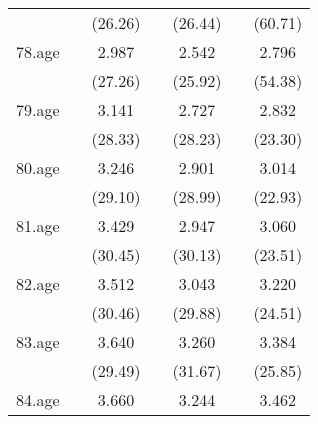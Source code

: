 {\begin{tabular}{l*{6}{c}}
            &                     &     (26.26)         &                     &     (26.44)         &                     &     (60.71)         \\
[1em]
78.age      &                     &       2.987\sym{***}&                     &       2.542\sym{***}&                     &       2.796\sym{***}\\
            &                     &     (27.26)         &                     &     (25.92)         &                     &     (54.38)         \\
[1em]
79.age      &                     &       3.141\sym{***}&                     &       2.727\sym{***}&                     &       2.832\sym{***}\\
            &                     &     (28.33)         &                     &     (28.23)         &                     &     (23.30)         \\
[1em]
80.age      &                     &       3.246\sym{***}&                     &       2.901\sym{***}&                     &       3.014\sym{***}\\
            &                     &     (29.10)         &                     &     (28.99)         &                     &     (22.93)         \\
[1em]
81.age      &                     &       3.429\sym{***}&                     &       2.947\sym{***}&                     &       3.060\sym{***}\\
            &                     &     (30.45)         &                     &     (30.13)         &                     &     (23.51)         \\
[1em]
82.age      &                     &       3.512\sym{***}&                     &       3.043\sym{***}&                     &       3.220\sym{***}\\
            &                     &     (30.46)         &                     &     (29.88)         &                     &     (24.51)         \\
[1em]
83.age      &                     &       3.640\sym{***}&                     &       3.260\sym{***}&                     &       3.384\sym{***}\\
            &                     &     (29.49)         &                     &     (31.67)         &                     &     (25.85)         \\
[1em]
84.age      &                     &       3.660\sym{***}&                     &       3.244\sym{***}&                     &       3.462\sym{***}\\

\end{tabular}}
